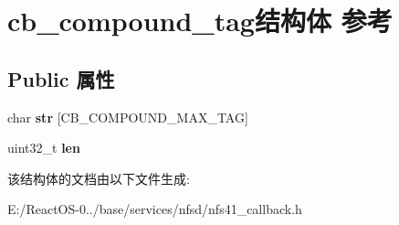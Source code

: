 \hypertarget{structcb__compound__tag}{}\section{cb\+\_\+compound\+\_\+tag结构体 参考}
\label{structcb__compound__tag}
\subsection*{Public 属性}
\begin{DoxyCompactItemize}
\item 
\mbox{\label{structcb__compound__tag_ae5337590c99cee5a71ce4ad90b48d26e}} 
char {\bfseries str} \mbox{[}C\+B\+\_\+\+C\+O\+M\+P\+O\+U\+N\+D\+\_\+\+M\+A\+X\+\_\+\+T\+AG\mbox{]}
\item 
\mbox{\label{structcb__compound__tag_ad939b84b66617a5998ac21fbd2641019}} 
uint32\+\_\+t {\bfseries len}
\end{DoxyCompactItemize}


该结构体的文档由以下文件生成\+:\begin{DoxyCompactItemize}
\item 
E\+:/\+React\+O\+S-\/0../base/services/nfsd/nfs41\+\_\+callback.\+h\end{DoxyCompactItemize}
